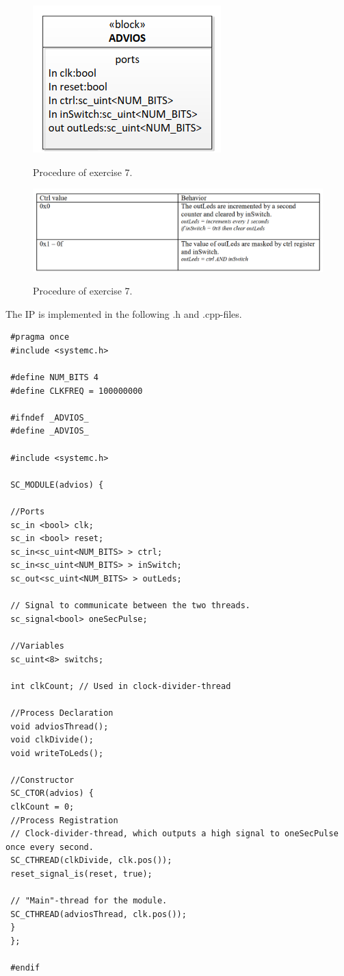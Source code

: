 \begin{figure}[b]
	\centering
	{\includegraphics[scale=0.5]{Images/2_7_block.png}}\\[0.5cm]
	\label{fig:7_block}
	\caption{Procedure of exercise 7.}
\end{figure}
\begin{figure}[b]
	\centering
	{\includegraphics[scale=0.5]{Images/2_7_functionality.png}}\\[0.5cm]
	\label{fig:7_functionality}
	\caption{Procedure of exercise 7.}
\end{figure}

\FloatBarrier

The IP is implemented in the following .h and .cpp-files.

 \begin{lstlisting}
 #pragma once
 #include <systemc.h>
 
 #define NUM_BITS 4
 #define CLKFREQ = 100000000 
 
 #ifndef _ADVIOS_
 #define _ADVIOS_
 
 #include <systemc.h>
 
 SC_MODULE(advios) {
 
 //Ports
 sc_in <bool> clk;
 sc_in <bool> reset;
 sc_in<sc_uint<NUM_BITS> > ctrl;
 sc_in<sc_uint<NUM_BITS> > inSwitch;
 sc_out<sc_uint<NUM_BITS> > outLeds;
 
 // Signal to communicate between the two threads.
 sc_signal<bool> oneSecPulse;
 
 //Variables
 sc_uint<8> switchs;
 
 int clkCount; // Used in clock-divider-thread
 
 //Process Declaration
 void adviosThread();
 void clkDivide();
 void writeToLeds();
 
 //Constructor
 SC_CTOR(advios) {
 clkCount = 0;
 //Process Registration
 // Clock-divider-thread, which outputs a high signal to oneSecPulse once every second.
 SC_CTHREAD(clkDivide, clk.pos());
 reset_signal_is(reset, true);
 
 // "Main"-thread for the module.
 SC_CTHREAD(adviosThread, clk.pos());
 }
 };
 
 #endif
 \end{lstlisting}
 \label{lst:advios_h}
 
